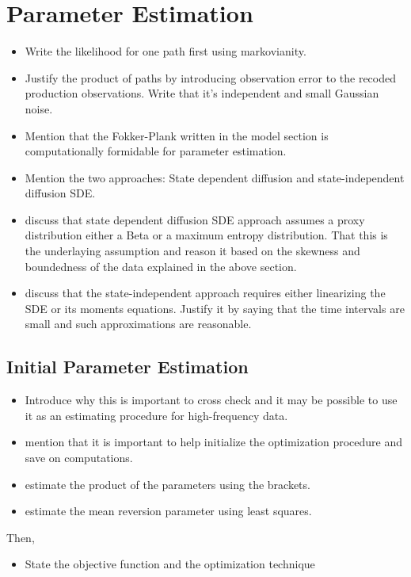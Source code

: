 \documentclass[10pt,twocolumn,letterpaper]{article}
\begin{document}
\section{Parameter Estimation}
\begin{itemize}
    \item Write the likelihood for one path first using markovianity.
    \item Justify the product of paths by introducing observation error to the recoded production observations. Write that it's independent and small Gaussian noise.
    \item Mention that the Fokker-Plank written in the model section is computationally formidable for parameter estimation.
    \item Mention the two approaches: State dependent diffusion and state-independent diffusion SDE.
    \item discuss that state dependent diffusion SDE approach assumes a proxy distribution either a Beta or a maximum entropy distribution. That this is the underlaying assumption and reason it based on the skewness and boundedness of the data explained in the above section.
    \item discuss that the state-independent approach requires either linearizing the SDE or its moments equations. Justify it by saying that the time intervals are small and such approximations are reasonable.
\end{itemize}

\subsection{Initial Parameter Estimation}

\begin{itemize}
    \item Introduce why this is important to cross check and it may be possible to use it as an estimating procedure for high-frequency data.
    \item mention that it is important to help initialize the optimization procedure and save on computations.
    \item estimate the product of the parameters using the brackets.
    \item estimate the mean reversion parameter using least squares.
\end{itemize}


Then,

\begin{itemize}
    \item State the objective function and the optimization technique
\end{itemize}
\end{document}
